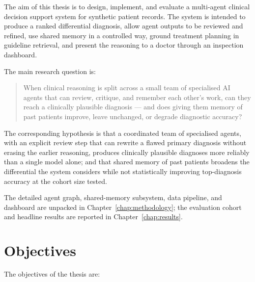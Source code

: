 The aim of this thesis is to design, implement, and evaluate a multi-agent
clinical decision support system for synthetic patient records. The system is
intended to produce a ranked differential diagnosis, allow agent outputs to be
reviewed and refined, use shared memory in a controlled way, ground treatment
planning in guideline retrieval, and present the reasoning to a doctor through
an inspection dashboard.

The main research question is:

\begin{quote}
When clinical reasoning is split across a small team of specialised AI agents
that can review, critique, and remember each other's work, can they reach a
clinically plausible diagnosis --- and does giving them memory of past
patients improve, leave unchanged, or degrade diagnostic accuracy?
\end{quote}

The corresponding hypothesis is that a coordinated team of specialised
agents, with an explicit review step that can rewrite a flawed primary
diagnosis without erasing the earlier reasoning, produces clinically
plausible diagnoses more reliably than a single model alone; and that
shared memory of past patients broadens the differential the system
considers while not statistically improving top-diagnosis accuracy at
the cohort size tested.

The detailed agent graph, shared-memory subsystem, data pipeline, and
dashboard are unpacked in Chapter~\ref{chap:methodology}; the evaluation
cohort and headline results are reported in Chapter~\ref{chap:results}.

\section{Objectives}
\label{sec:objectives}

The objectives of the thesis are:

